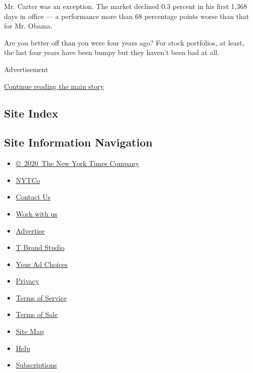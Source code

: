 Mr. Carter was an exception. The market declined 0.3 percent in his
first 1,368 days in office --- a performance more than 68 percentage
points worse than that for Mr. Obama.

Are you better off than you were four years ago? For stock portfolios,
at least, the last four years have been bumpy but they haven't been bad
at all.

Advertisement

\protect\hyperlink{after-bottom}{Continue reading the main story}

\hypertarget{site-index}{%
\subsection{Site Index}\label{site-index}}

\hypertarget{site-information-navigation}{%
\subsection{Site Information
Navigation}\label{site-information-navigation}}

\begin{itemize}
\tightlist
\item
  \href{https://help.nytimes3xbfgragh.onion/hc/en-us/articles/115014792127-Copyright-notice}{©~2020~The
  New York Times Company}
\end{itemize}

\begin{itemize}
\tightlist
\item
  \href{https://www.nytco.com/}{NYTCo}
\item
  \href{https://help.nytimes3xbfgragh.onion/hc/en-us/articles/115015385887-Contact-Us}{Contact
  Us}
\item
  \href{https://www.nytco.com/careers/}{Work with us}
\item
  \href{https://nytmediakit.com/}{Advertise}
\item
  \href{http://www.tbrandstudio.com/}{T Brand Studio}
\item
  \href{https://www.nytimes3xbfgragh.onion/privacy/cookie-policy\#how-do-i-manage-trackers}{Your
  Ad Choices}
\item
  \href{https://www.nytimes3xbfgragh.onion/privacy}{Privacy}
\item
  \href{https://help.nytimes3xbfgragh.onion/hc/en-us/articles/115014893428-Terms-of-service}{Terms
  of Service}
\item
  \href{https://help.nytimes3xbfgragh.onion/hc/en-us/articles/115014893968-Terms-of-sale}{Terms
  of Sale}
\item
  \href{https://spiderbites.nytimes3xbfgragh.onion}{Site Map}
\item
  \href{https://help.nytimes3xbfgragh.onion/hc/en-us}{Help}
\item
  \href{https://www.nytimes3xbfgragh.onion/subscription?campaignId=37WXW}{Subscriptions}
\end{itemize}
